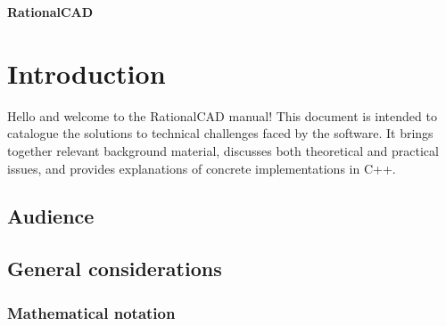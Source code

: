 \documentclass[oneside]{memoir}
\begin{document}
 

   
\frontmatter

\thispagestyle{empty}
   
\textbf{{\Huge RationalCAD}}

\clearpage



\tableofcontents* 
  

\mainmatter  
{}
     
\chapter{Introduction}         

Hello and welcome to the RationalCAD manual! This document is intended to
catalogue the solutions to technical challenges faced by the software. It brings
together relevant background material, discusses both theoretical and practical 
issues, and provides explanations of concrete implementations in C++.   

\section{Audience}  
 
\section{General considerations} 
 
\subsection{Mathematical notation}
   
\end{document}
